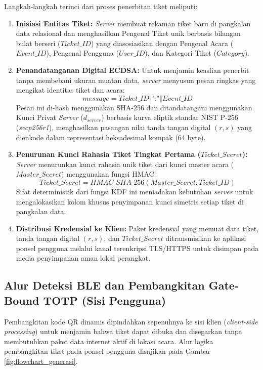 Langkah-langkah terinci dari proses penerbitan tiket meliputi:
\begin{enumerate}
    \item \textbf{Inisiasi Entitas Tiket:} \textit{Server} membuat rekaman tiket baru di pangkalan data relasional dan menghasilkan Pengenal Tiket unik berbasis bilangan bulat berseri ($Ticket\_ID$) yang diasosiasikan dengan Pengenal Acara ($Event\_ID$), Pengenal Pengguna ($User\_ID$), dan Kategori Tiket ($Category$).
    \item \textbf{Penandatanganan Digital ECDSA:} Untuk menjamin keaslian penerbit tanpa membebani ukuran muatan data, \textit{server} menyusun pesan ringkas yang mengikat identitas tiket dan acara:
    \begin{equation}
        message = Ticket\_ID \mathbin{\Vert} \text{":"} \mathbin{\Vert} Event\_ID
    \end{equation}
    Pesan ini di-hash menggunakan SHA-256 dan ditandatangani menggunakan Kunci Privat \textit{Server} ($d_{server}$) berbasis kurva eliptik standar NIST P-256 (\textit{secp256r1}), menghasilkan pasangan nilai tanda tangan digital $(r, s)$ yang dienkode dalam representasi heksadesimal kompak (64 byte).
    \item \textbf{Penurunan Kunci Rahasia Tiket Tingkat Pertama ($Ticket\_Secret$):} \textit{Server} menurunkan kunci rahasia unik tiket dari kunci master acara ($Master\_Secret$) menggunakan fungsi HMAC:
    \begin{equation}
        Ticket\_Secret = HMAC\text{-}SHA\text{-}256(Master\_Secret, Ticket\_ID)
    \end{equation}
    Sifat deterministik dari fungsi KDF ini meniadakan kebutuhan \textit{server} untuk mengalokasikan kolom khusus penyimpanan kunci simetris setiap tiket di pangkalan data.
    \item \textbf{Distribusi Kredensial ke Klien:} Paket kredensial yang memuat data tiket, tanda tangan digital $(r, s)$, dan $Ticket\_Secret$ ditransmisikan ke aplikasi ponsel pengguna melalui kanal terenkripsi TLS/HTTPS untuk disimpan pada media penyimpanan aman lokal perangkat.
\end{enumerate}

\subsection{Alur Deteksi BLE dan Pembangkitan Gate-Bound TOTP (Sisi Pengguna)}
\label{subsec:alur_pembangkitan}
Pembangkitan kode QR dinamis dipindahkan sepenuhnya ke sisi klien (\textit{client-side processing}) untuk menjamin bahwa tiket dapat dibuka dan disegarkan tanpa membutuhkan paket data internet aktif di lokasi acara. Alur logika pembangkitan tiket pada ponsel pengguna disajikan pada Gambar \ref{fig:flowchart_generasi}.

